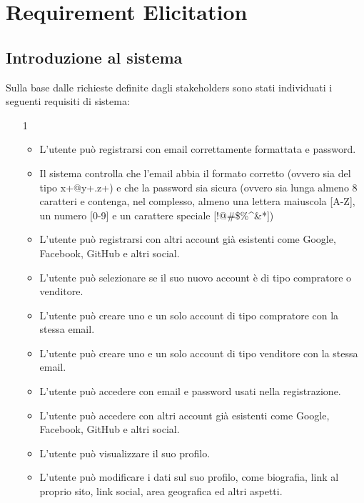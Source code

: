 
\chapter{Requirement Elicitation}
     \section{Introduzione al sistema} %
        Sulla base dalle richieste definite dagli stakeholders sono stati individuati i seguenti requisiti di sistema:
        
        \begin{itemize}
            \item[1]
                \begin{itemize}
                    \item L'utente può registrarsi con email correttamente formattata e password.
                    \item Il sistema controlla che l'email abbia il formato corretto (ovvero sia del tipo x+@y+.z+) e che la password sia sicura (ovvero sia lunga almeno 8 caratteri e contenga, nel complesso, almeno una lettera maiuscola [A-Z], un numero [0-9] e un carattere speciale [!@\#\$\%\^{}\&*])
                    \item L'utente può registrarsi con altri account già esistenti come Google, Facebook, GitHub e altri social.
                    \item L'utente può selezionare se il suo nuovo account è di tipo compratore o venditore.
                    \item L'utente può creare uno e un solo account di tipo compratore con la stessa email.
                    \item L'utente può creare uno e un solo account di tipo venditore con la stessa email.
                    \item L'utente può accedere con email e password usati nella registrazione.
                    \item L'utente può accedere con altri account già esistenti come Google, Facebook, GitHub e altri social.
                    \item L'utente può visualizzare il suo profilo.
                    \item L'utente può modificare i dati sul suo profilo, come biografia, link al proprio sito, link social, area geografica ed altri aspetti.
                \end{itemize}

\end{itemize}

